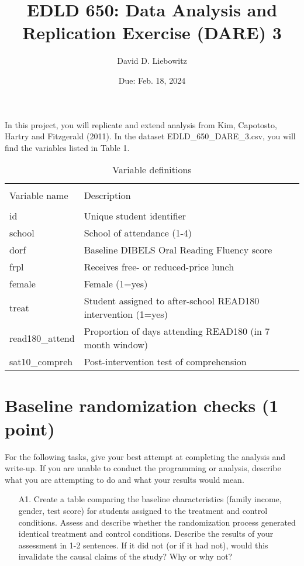 \documentclass[a4paper, 11pt]{article}
\title{EDLD 650: Data Analysis and Replication Exercise (DARE) 3}
\author{David D. Liebowitz}
\date{Due: Feb. 18, 2024}
\begin{document}
\maketitle

In this project, you will replicate and extend analysis from Kim, Capotosto, Hartry and Fitzgerald (2011). In the dataset EDLD\_650\_DARE\_3.csv, you will find the variables listed in Table 1. 

\begin{table}[!htbp] \centering 
  \caption{Variable definitions} 
  \label{} 
\begin{tabular}{ll} 
\\[-1.8ex]\hline 
\\[-1.8ex] Variable name & Description \\ 
\hline \\[-1.8ex]
id & Unique student identifier \\
school & School of attendance (1-4) \\
dorf & Baseline DIBELS Oral Reading Fluency score \\
frpl & Receives free- or reduced-price lunch \\
female & Female (1=yes) \\
treat & Student assigned to after-school READ180 intervention (1=yes) \\
read180\_attend & Proportion of days attending READ180 (in 7 month window) \\
sat10\_compreh & Post-intervention test of comprehension \\

\hline
\hline

\end{tabular}
\end{table}

\section{Baseline randomization checks (1 point)}
For the following tasks, give your best attempt at completing the analysis and write-up. If you are unable to conduct the programming or analysis, describe what you are attempting to do and what your results would mean.

\begin{enumerate}
	\item[A1.] Create a table comparing the baseline characteristics (family income, gender, test score) for students assigned to the treatment and control conditions. Assess and describe whether the randomization process generated identical treatment and control conditions. Describe the results of your assessment in 1-2 sentences. If it did not (or if it had not), would this invalidate the causal claims of the study? Why or why not?

\end{enumerate}
\end{document}
